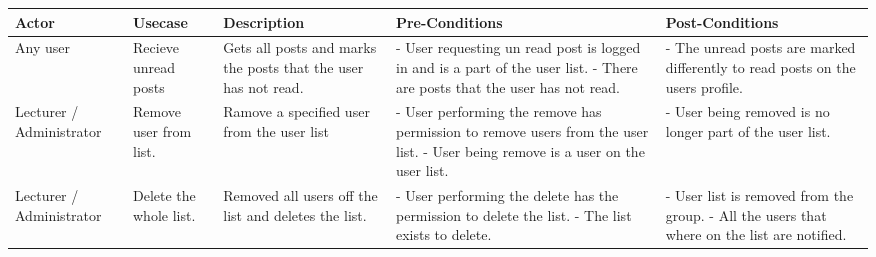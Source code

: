 \documentclass{report}
\begin{document}
	\begin{table}[h]
		\begin{tabular}{@{}|p{2cm}|p{2cm}|p{3cm}|p{3cm}|p{3cm}|@{}}
			\toprule
			Actor &
			Usecase & 
			Description & 
			Pre-Conditions & 
			Post-Conditions \\ \midrule
			
			Any user
			& Recieve unread posts 
			& Gets all posts and marks the posts that the user has not read.
			& - User requesting un read post is logged in and is a part of the user list. \newline 
			- There are posts that the user has not read. 
			& - The unread posts are marked differently to read posts on the users profile. \\ \midrule
			
			
			Lecturer / Administrator
			& Remove user from list.
			& Ramove a specified user from the user list 
			& - User performing the remove has permission to remove users from the user list. \newline 
			- User being remove is a user on the user list. 
			& - User being removed is no longer part of the user list. \\ \midrule
			
			Lecturer / Administrator 
			& Delete the whole list.
			& Removed all users off the list and deletes the list. 
			& - User performing the delete has the permission to delete the list. \newline 
			- The list exists to delete. 
			& - User list is removed from the group. \newline 
			- All the users that where on the list are notified.  \\ \bottomrule
		\end{tabular}
	\end{table}
\end{document}
